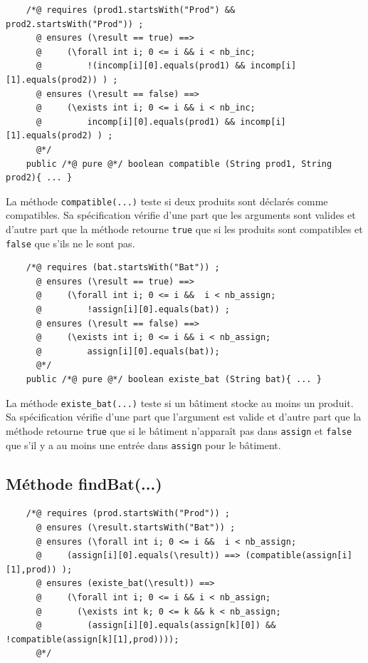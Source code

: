 \documentclass{article}
\begin{document}
\noindent
\begin{verbatim}
    /*@ requires (prod1.startsWith("Prod") && prod2.startsWith("Prod")) ;
      @ ensures (\result == true) ==>
      @     (\forall int i; 0 <= i && i < nb_inc;
      @	        !(incomp[i][0].equals(prod1) && incomp[i][1].equals(prod2)) ) ;
      @ ensures (\result == false) ==>
      @	    (\exists int i; 0 <= i && i < nb_inc; 
      @	        incomp[i][0].equals(prod1) && incomp[i][1].equals(prod2) ) ;
      @*/
    public /*@ pure @*/ boolean compatible (String prod1, String prod2){ ... }
\end{verbatim}
\vspace{0.2cm}

\noindent
La méthode \texttt{compatible(...)} teste si deux produits sont déclarés comme compatibles. Sa spécification vérifie d'une part que les arguments sont valides et d'autre part que la méthode retourne \texttt{true} que si les produits sont compatibles et \texttt{false} que s'ils ne le sont pas.

\vspace{0.3cm}
\noindent
\begin{verbatim}
    /*@ requires (bat.startsWith("Bat")) ;
      @ ensures (\result == true) ==>
      @	    (\forall int i; 0 <= i &&  i < nb_assign;
      @	        !assign[i][0].equals(bat)) ;
      @ ensures (\result == false) ==>
      @     (\exists int i; 0 <= i && i < nb_assign;
      @	        assign[i][0].equals(bat)); 
      @*/
    public /*@ pure @*/ boolean existe_bat (String bat){ ... }
\end{verbatim}
\vspace{0.2cm}

\noindent
La méthode \texttt{existe\_bat(...)} teste si un bâtiment stocke au moins un produit. Sa spécification vérifie d'une part que l'argument est valide et d'autre part que la méthode retourne \texttt{true} que si le bâtiment n'apparaît pas dans \texttt{assign} et \texttt{false} que s'il y a au moins une entrée dans \texttt{assign} pour le bâtiment.

\subsection{Méthode findBat(...)}

\noindent
\begin{verbatim}
    /*@ requires (prod.startsWith("Prod")) ;
      @ ensures (\result.startsWith("Bat")) ;
      @ ensures (\forall int i; 0 <= i &&  i < nb_assign;
      @	    (assign[i][0].equals(\result)) ==> (compatible(assign[i][1],prod)) );
      @ ensures (existe_bat(\result)) ==>
      @	    (\forall int i; 0 <= i && i < nb_assign;
      @	      (\exists int k; 0 <= k && k < nb_assign;
      @	        (assign[i][0].equals(assign[k][0]) && !compatible(assign[k][1],prod))));
      @*/
\end{verbatim}
\vspace{0.2cm}
\end{document}
